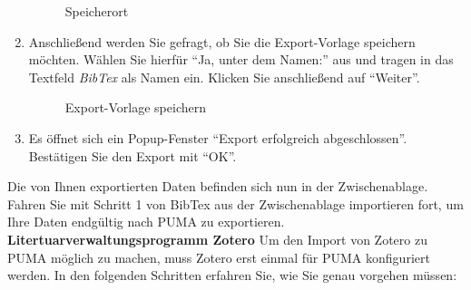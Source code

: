 \begin{enumerate}
\begin{figure}[h!]
 \centering
 \caption{Speicherort}
 \label{figure049}
\end{figure}
    \item Anschließend werden Sie gefragt, ob Sie die Export-Vorlage speichern möchten. Wählen Sie hierfür \enquote{Ja, unter dem Namen:} aus und tragen in das Textfeld \textit{BibTex} als Namen ein. Klicken Sie anschließend auf \enquote{Weiter}.
   
\begin{figure}[h!]
 \centering
 \caption{Export-Vorlage speichern}
 \label{figure050}
\end{figure}
    \item Es öffnet sich ein Popup-Fenster \enquote{Export erfolgreich abgeschlossen}. Bestätigen Sie den Export mit \enquote{OK}.
\end{enumerate}
Die von Ihnen exportierten Daten befinden sich nun in der Zwischenablage. Fahren Sie mit Schritt 1 von BibTex aus der Zwischenablage importieren fort, um Ihre Daten endgültig nach PUMA zu exportieren.\newline
\newline
\textbf{Litertuarverwaltungsprogramm Zotero} 
\newline \newline
Um den Import von Zotero zu PUMA möglich zu machen, muss Zotero erst einmal für PUMA konfiguriert werden. In den folgenden Schritten erfahren Sie, wie Sie genau vorgehen müssen:
